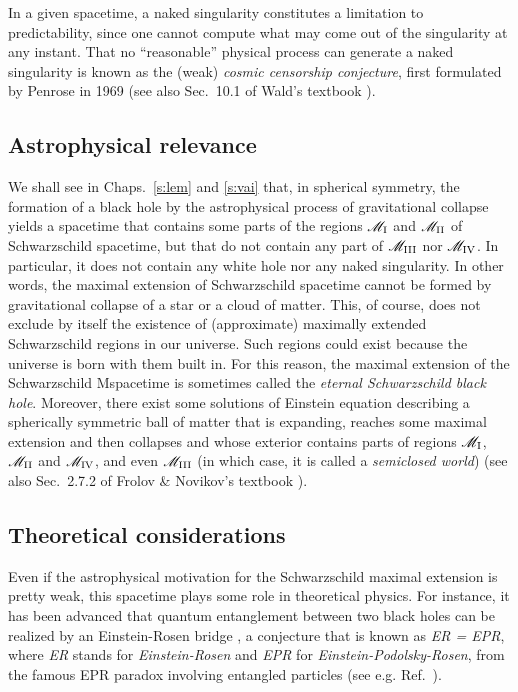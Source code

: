 In a given spacetime, a naked singularity constitutes a limitation to predictability, since one cannot compute what may come out of the singularity at any instant.
That no ``reasonable'' physical process
can generate a naked singularity is known as the (weak) \emph{cosmic censorship conjecture}, first
formulated by Penrose in 1969 \cite{Penro69} (see also Sec.~10.1 of Wald's textbook \cite{Wald84}).


\subsection{Astrophysical relevance}

We shall see in Chaps.~\ref{s:lem} and \ref{s:vai} that, in spherical symmetry,
the formation of a black hole by the astrophysical
process of gravitational collapse yields a spacetime
that contains some parts of the regions $\mathscr{M}_{\rm I}$
and $\mathscr{M}_{\rm II}$ of Schwarzschild spacetime, but that do not contain
any part of $\mathscr{M}_{\rm III}$ nor $\mathscr{M}_{\rm IV}$. In particular, it does not contain any white hole nor
any naked singularity. In other words, the maximal extension of Schwarzschild spacetime
cannot be formed by gravitational collapse of a star or a cloud of matter.
This, of course, does not exclude by itself the existence of (approximate) maximally extended Schwarzschild regions in our universe. Such regions could exist because the universe is born
with them built in. For this reason, the maximal extension of the Schwarzschild Mspacetime
is sometimes called the \emph{eternal Schwarzschild black hole}.
Moreover, there exist some solutions of Einstein equation describing a
spherically symmetric ball of matter that is
expanding, reaches some maximal extension and then collapses and whose
exterior contains parts of regions $\mathscr{M}_{\rm I}$, $\mathscr{M}_{\rm II}$ and $\mathscr{M}_{\rm IV}$, and even $\mathscr{M}_{\rm III}$ (in which case, it is called a \emph{semiclosed world}) \cite{Novik63} (see also Sec.~2.7.2 of Frolov \& Novikov's textbook \cite{FroloN98}).

\subsection{Theoretical considerations}

Even if the astrophysical motivation for the Schwarzschild maximal extension is pretty weak,
this spacetime plays some role in theoretical physics. For instance, it has been advanced
that quantum entanglement between two black holes can be realized by an Einstein-Rosen bridge
\cite{MaldaS13}, a conjecture that is known as \emph{ER = EPR},
where \emph{ER} stands for \emph{Einstein-Rosen} and  \emph{EPR} for \emph{Einstein-Podolsky-Rosen}, from the famous EPR paradox
involving entangled particles (see e.g. Ref.~\cite{LeBel06}).
